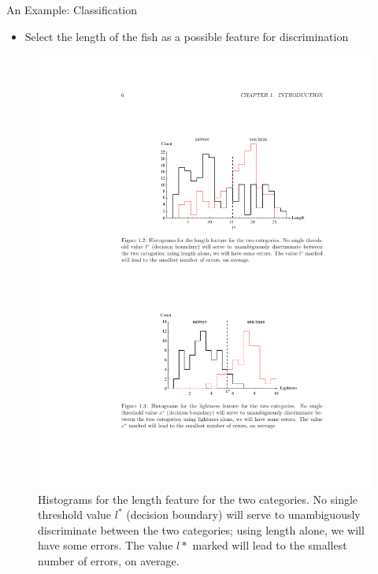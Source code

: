 
\begin{frame}{An Example: Classification}
\begin{itemize}
\item Select the length of the fish as a possible feature for discrimination
\end{itemize}
\begin{figure}
\includegraphics[scale=0.75]{Figures/Ch0101}
\caption{Histograms for the length feature for the two categories. No single threshold value $l^*$ (decision boundary) will serve to unambiguously discriminate between the two categories; using length alone, we will have some errors. The value $l*$ marked will lead to the smallest number of errors, on average.}
\end{figure}
\end{frame}

